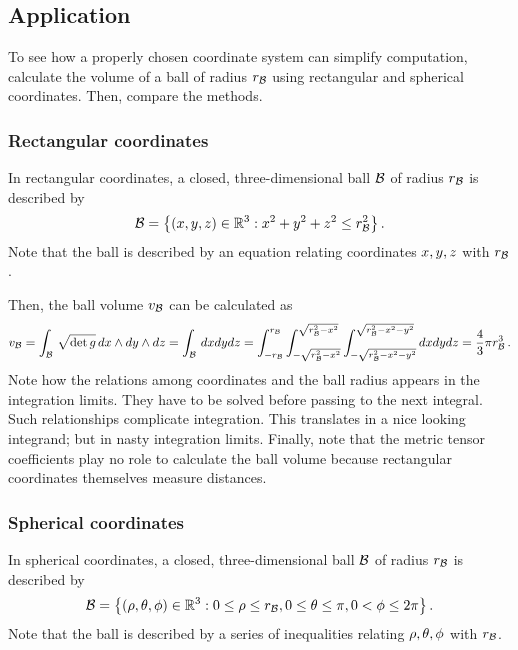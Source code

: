 \providecommand*{\ball}{\cregion B}
%
\providecommand*{\radius}{r}
\providecommand*{\rball}{\radius_{\ball}}
\providecommand*{\volume}{v}
\providecommand*{\volball}{\volume_{\ball}}


\subsection{Application}
%
To see how a properly chosen coordinate system can simplify computation, calculate the volume of a ball of radius $\rball$ using rectangular and spherical coordinates. Then, compare the methods.


\subsubsection{Rectangular coordinates}
%
In rectangular coordinates, a closed, three-dimensional ball $\ball$ of radius $\rball$ is described by
%
\begin{equation*}
  \ball = \setprop{\tuple{\xpos,\ypos,\zpos}\in\nrspace 3}{\xpos^2 + \ypos^2 + \zpos^2 \leq \rball^2}\,.
\end{equation*}
%
Note that the ball is described by an equation relating coordinates $x,y,z$ with $\rball$.

Then, the ball volume $\volball$ can be calculated as
%
\begin{equation*}
  \volball = \int_\ball\,\sqrt{\det\metric}\,d\xpos\oprod d\ypos\oprod d\zpos
           = \int_\ball\,d\xpos d\ypos d\zpos
           =  \int_{-\rball}^{\rball}
              \int_{-\sqrt{\rball^2 - \xpos^2}}^{\sqrt{\rball^2 - \xpos^2}} 
              \int_{-\sqrt{\rball^2 - \xpos^2 - \ypos^2}}^{\sqrt{\rball^2 - \xpos^2 - \ypos^2}}
                d\xpos d\ypos d\zpos
           = \dfrac 43\pi\rball^3 \,.
\end{equation*}
%
Note how the relations among coordinates and the ball radius appears in the integration limits. They have to be solved before passing to the next integral. Such relationships complicate integration. This translates in a nice looking integrand; but in nasty integration limits. Finally, note that the metric tensor coefficients play no role to calculate the ball volume because rectangular coordinates themselves measure distances.


\subsubsection{Spherical coordinates}
%
In spherical coordinates, a closed, three-dimensional ball $\ball$ of radius $\rball$ is described by
%
\begin{equation*}
  \ball = \setprop{\tuple{\sxpos,\sypos,\szpos}\in\nrspace 3}
          { 
            0\leq\sxpos\leq\rball, 
            0\leq\sypos\leq\pi, 
            0 < \szpos\leq 2\pi
          }\,.
\end{equation*}
%
Note that the ball is described by a series of inequalities relating $\rho,\theta,\phi$ with $\rball$.


